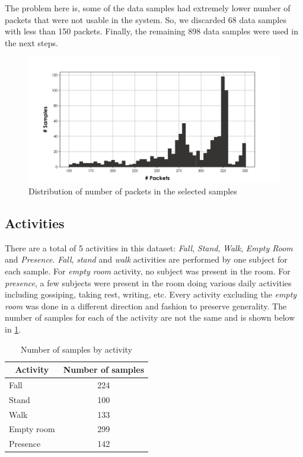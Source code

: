 The problem here is, some of the data samples had extremely lower number of packets that were not usable in the system. So, we discarded 68 data samples with less than 150 packets. Finally, the remaining 898 data samples were used in the next steps. 

\begin{figure}[H]
\centering
\includegraphics[width=1.0\textwidth]{./figure/chap 4/selected_data_sizes.png}
\caption{Distribution of number of packets in the selected samples}
\label{Fig 4.7}
\end{figure}

\subsection{Activities}
There are a total of 5 activities in this dataset: \emph{Fall}, \emph{Stand}, \emph{Walk}, \emph{Empty Room} and \emph{Presence}. \emph{Fall}, \emph{stand} and \emph{walk} activities are performed by one subject for each sample. For \emph{empty room} activity, no subject was present in the room. For \emph{presence}, a few subjects were present in the room doing various daily activities including gossiping, taking rest, writing, etc. Every activity excluding the \emph{empty room} was done in a different direction and fashion to preserve generality. The number of samples for each of the activity are not the same and is shown below in \ref{Table 4.2}.

\begin{table}[H]
\caption{Number of samples by activity}
\vspace{2mm}
\centering
\begin{tabular}{|l|c|} 
\hline
\multicolumn{1}{|c|}{\textbf{Activity}} & \multicolumn{1}{c|}{\textbf{Number of samples}}                                                      \\ 
\hline
Fall                   & 224            \\
Stand                  & 100            \\
Walk                   & 133            \\
Empty room             & 299            \\
Presence               & 142            \\
\hline
\end{tabular}
\label{Table 4.2}
\end{table}

